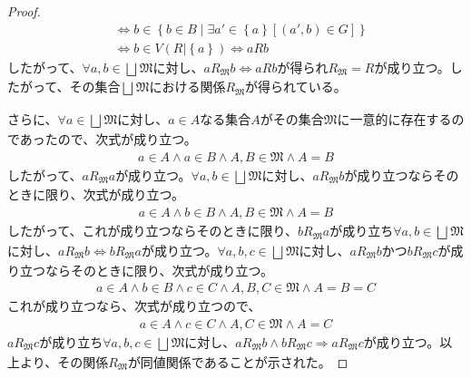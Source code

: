 \documentclass[dvipdfmx]{jsarticle}
\begin{document}
\begin{proof}
\begin{align*}
&\Leftrightarrow b \in \left\{ b \in B \middle| \exists a' \in \left\{ a \right\}\left[ \left( a',b \right) \in G \right] \right\}\\
&\Leftrightarrow b \in V\left( R|\left\{ a \right\} \right) \Leftrightarrow aRb
\end{align*}
したがって、$\forall a,b \in \bigsqcup_{} \mathfrak{M}$に対し、$aR_{\mathfrak{M}}b \Leftrightarrow aRb$が得られ$R_{\mathfrak{M}} = R$が成り立つ。したがって、その集合$\bigsqcup_{} \mathfrak{M}$における関係$R_{\mathfrak{M}}$が得られている。\par
さらに、$\forall a \in \bigsqcup_{} \mathfrak{M}$に対し、$a \in A$なる集合$A$がその集合$\mathfrak{M}$に一意的に存在するのであったので、次式が成り立つ。
\begin{align*}
a \in A \land a \in B \land A,B\in \mathfrak{M \land}A = B
\end{align*}
したがって、$aR_{\mathfrak{M}}a$が成り立つ。$\forall a,b \in \bigsqcup_{} \mathfrak{M}$に対し、$aR_{\mathfrak{M}}b$が成り立つならそのときに限り、次式が成り立つ。
\begin{align*}
a \in A \land b \in B \land A,B \in \mathfrak{M \land}A = B
\end{align*}
したがって、これが成り立つならそのときに限り、$bR_{\mathfrak{M}}a$が成り立ち$\forall a,b \in \bigsqcup_{} \mathfrak{M}$に対し、$aR_{\mathfrak{M}}b \Leftrightarrow bR_{\mathfrak{M}}a$が成り立つ。$\forall a,b,c \in \bigsqcup_{} \mathfrak{M}$に対し、$aR_{\mathfrak{M}}b$かつ$bR_{\mathfrak{M}}c$が成り立つならそのときに限り、次式が成り立つ。
\begin{align*}
a \in A \land b \in B \land c \in C \land A,B,C \in \mathfrak{M \land}A = B = C
\end{align*}
これが成り立つなら、次式が成り立つので、
\begin{align*}
a \in A \land c \in C \land A,C \in \mathfrak{M \land}A = C
\end{align*}
$aR_{\mathfrak{M}}c$が成り立ち$\forall a,b,c \in \bigsqcup_{} \mathfrak{M}$に対し、$aR_{\mathfrak{M}}b \land bR_{\mathfrak{M}}c \Rightarrow aR_{\mathfrak{M}}c$が成り立つ。以上より、その関係$R_{\mathfrak{M}}$が同値関係であることが示された。
\end{proof}
\end{document}
